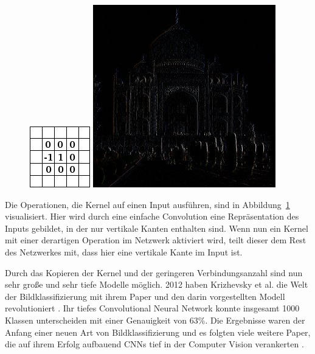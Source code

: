 \documentclass[pdftex,a4paper,halfparskip, article]{scrartcl}
\begin{document}
\begin{figure}
\centering
\begin{minipage}{.5\textwidth}
  \centering
  \includegraphics[width=.3\linewidth]{gimp_doku_edges_kernel}
\end{minipage}%
\begin{minipage}{.5\textwidth}
  \centering
  \includegraphics[width=.8\linewidth]{gimp_doku_edges}
  \end{minipage}
  \label{fig:kernel}
\end{figure}

Die Operationen, die Kernel auf einen Input ausführen, sind in Abbildung~\ref{fig:kernel} visualisiert. Hier wird durch eine einfache Convolution eine Repräsentation des Inputs gebildet, in der nur vertikale Kanten enthalten sind. Wenn nun ein Kernel mit einer derartigen Operation im Netzwerk aktiviert wird, teilt dieser dem Rest des Netzwerkes mit, dass hier eine vertikale Kante im Input ist.

Durch das Kopieren der Kernel und der geringeren Verbindungsanzahl sind nun sehr große und sehr tiefe Modelle möglich. 2012 haben Krizhevsky et al. die Welt der Bildklassifizierung mit ihrem Paper und den darin vorgestellten Modell revolutioniert \cite{ImageNetOriginal}. Ihr tiefes Convolutional Neural Network konnte insgesamt 1000 Klassen unterscheiden mit einer Genauigkeit von 63\%. Die Ergebnisse waren der Anfang einer neuen Art von Bildklassifizierung und es folgten viele weitere Paper, die auf ihrem Erfolg aufbauend CNNs tief in der Computer Vision verankerten \cite{colahsBlogCnn}.
\end{document}
